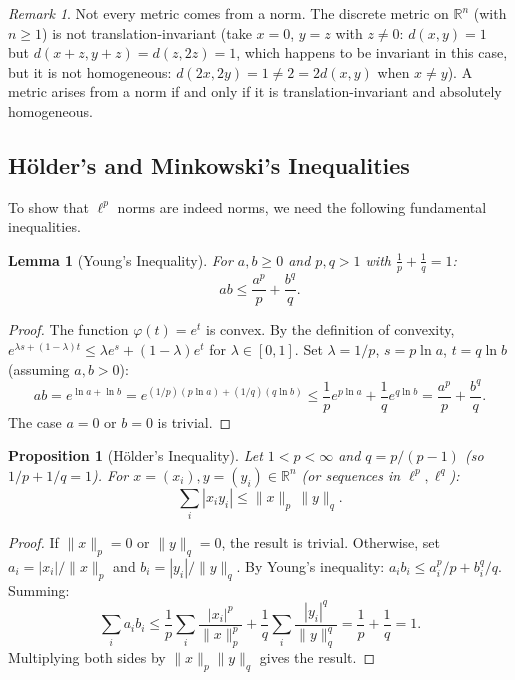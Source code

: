 \documentclass[11pt,a4paper]{article}
\theoremstyle{definition}
\theoremstyle{plain}
\newtheorem{lemma}[theorem]{Lemma}
\newtheorem{proposition}[theorem]{Proposition}
\theoremstyle{remark}
\newtheorem{remark}{Remark}[section]
\newcommand{\R}{\mathbb{R}}
\begin{document}
\begin{remark}
Not every metric comes from a norm. The discrete metric on $\R^n$ (with $n \ge 1$)
is not translation-invariant (take $x = 0$, $y = z$ with $z \ne 0$:
$d(x,y) = 1$ but $d(x+z, y+z) = d(z, 2z) = 1$, which happens to be invariant in
this case, but it is not homogeneous: $d(2x, 2y) = 1 \ne 2 = 2 d(x,y)$ when
$x \ne y$). A metric arises from a norm if and only if it is translation-invariant
and absolutely homogeneous.
\end{remark}

\subsection{H\"{o}lder's and Minkowski's Inequalities}

To show that $\ell^p$ norms are indeed norms, we need the following fundamental
inequalities.

\begin{lemma}[Young's Inequality]
\label{lem:young}
For $a, b \ge 0$ and $p, q > 1$ with $\frac{1}{p} + \frac{1}{q} = 1$:
\[
ab \le \frac{a^p}{p} + \frac{b^q}{q}.
\]
\end{lemma}

\begin{proof}
The function $\varphi(t) = e^t$ is convex. By the definition of convexity,
$e^{\lambda s + (1-\lambda)t} \le \lambda e^s + (1-\lambda) e^t$ for
$\lambda \in [0,1]$. Set $\lambda = 1/p$, $s = p \ln a$, $t = q \ln b$ (assuming
$a, b > 0$):
\[
ab = e^{\ln a + \ln b} = e^{(1/p)(p \ln a) + (1/q)(q \ln b)} \le
\frac{1}{p} e^{p \ln a} + \frac{1}{q} e^{q \ln b} = \frac{a^p}{p} + \frac{b^q}{q}.
\]
The case $a = 0$ or $b = 0$ is trivial.
\end{proof}

\begin{proposition}[H\"{o}lder's Inequality]
\label{prop:holder}
Let $1 < p < \infty$ and $q = p/(p-1)$ (so $1/p + 1/q = 1$). For
$x = (x_i), y = (y_i) \in \R^n$ (or sequences in $\ell^p, \ell^q$):
\[
\sum_{i} |x_i y_i| \le \|x\|_p \, \|y\|_q.
\]
\end{proposition}

\begin{proof}
If $\|x\|_p = 0$ or $\|y\|_q = 0$, the result is trivial. Otherwise, set
$a_i = |x_i|/\|x\|_p$ and $b_i = |y_i|/\|y\|_q$. By Young's inequality:
$a_i b_i \le a_i^p/p + b_i^q/q$. Summing:
\[
\sum_i a_i b_i \le \frac{1}{p} \sum_i \frac{|x_i|^p}{\|x\|_p^p} +
\frac{1}{q} \sum_i \frac{|y_i|^q}{\|y\|_q^q} = \frac{1}{p} + \frac{1}{q} = 1.
\]
Multiplying both sides by $\|x\|_p \|y\|_q$ gives the result.
\end{proof}
\end{document}
